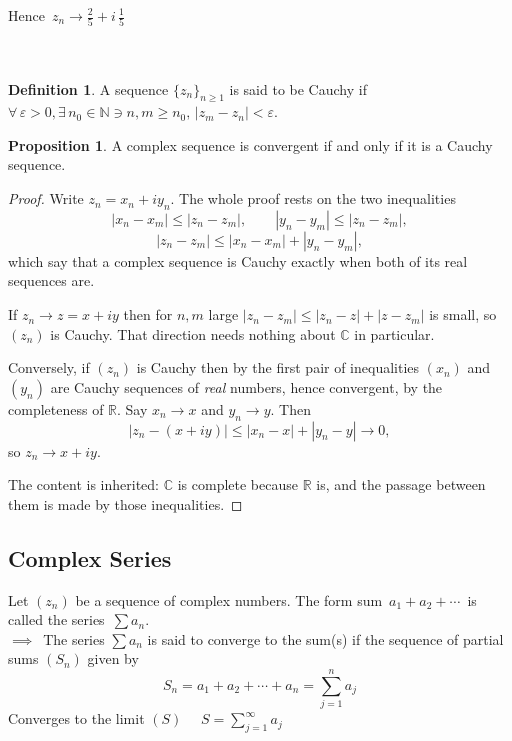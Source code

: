 \documentclass[11pt,a4paper]{article}
\theoremstyle{definition}
\newtheorem{definition}[thm]{Definition}
\newtheorem{proposition}[thm]{Proposition}
\begin{document}
Hence $\, z_n \longrightarrow \frac{2}{5} + i\,\frac{1}{5}$\\\\\\



\begin{definition}
A sequence $\{z_n\}_{n\geq 1}$ is said to be Cauchy if $\forall \, \varepsilon > 0, \exists\, n_0 \in \mathbb{N} \ni n,m \geq n_0,\,\left|z_m - z_n\right| < \varepsilon$.
\end{definition}

\begin{proposition}
A complex sequence is convergent if and only if it is a Cauchy sequence.
\end{proposition}

\begin{proof}
Write $z_n=x_n+iy_n$. The whole proof rests on the two inequalities
$$\left|x_n-x_m\right|\leq\left|z_n-z_m\right|,\qquad
\left|y_n-y_m\right|\leq\left|z_n-z_m\right|,$$
$$\left|z_n-z_m\right|\leq\left|x_n-x_m\right|+\left|y_n-y_m\right|,$$
which say that a complex sequence is Cauchy exactly when both of its real
sequences are.

If $z_n\rightarrow z=x+iy$ then for $n,m$ large
$\left|z_n-z_m\right|\leq\left|z_n-z\right|+\left|z-z_m\right|$ is small, so
$(z_n)$ is Cauchy. That direction needs nothing about $\mathbb{C}$ in
particular.

Conversely, if $(z_n)$ is Cauchy then by the first pair of inequalities $(x_n)$
and $(y_n)$ are Cauchy sequences of \emph{real} numbers, hence convergent, by
the completeness of $\mathbb{R}$. Say $x_n\rightarrow x$ and $y_n\rightarrow
y$. Then
$$\left|z_n-(x+iy)\right|\leq\left|x_n-x\right|+\left|y_n-y\right|
\longrightarrow 0 ,$$
so $z_n\rightarrow x+iy$.

The content is inherited: $\mathbb{C}$ is complete because $\mathbb{R}$ is, and
the passage between them is made by those inequalities.
\end{proof}

{\color[wave]{485}\subsection{Complex Series}}
Let $(z_n)$ be a sequence of complex numbers. The form sum $\, a_1 + a_2+ \cdots\,$ is called the series $\,\displaystyle{ \sum a_n}$.\\

$\implies\,$ The series $\displaystyle{\sum a_n}$ is said to converge to the sum(s) if the sequence of partial sums $(S_n)$ given by $$ S_n = a_1 + a_2 + \cdots + a_n = \sum^n_{j=1}a_j$$ Converges to the limit $(S)$ $\quad  S = \displaystyle{\sum^{\infty}_{j=1}a_j}$\\
\end{document}
